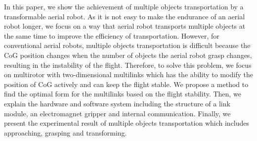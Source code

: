 In this paper, we show the achievement of multiple objects transportation by a transformable aerial robot. As it is not easy to make the endurance of an aerial robot longer, we focus on a way that aerial robot transports multiple objects at the same time to improve the efficiency of transportation. However, for conventional aerial robots, multiple objects transportation is difficult because the CoG position changes when the number of objects the aerial robot grasp changes, resulting in the instability of the flight. Therefore, to solve this problem, we focus on multirotor with two-dimensional multilinks which has the ability to modify the position of CoG actively and can keep the flight stable. We propose a method to find the optimal form for the multilinks based on the flight stability. Then, we explain the hardware and software system including the structure of a link module, an electromagnet gripper and internal communication. Finally, we present the experimental result of multiple objects transportation which includes approaching, grasping and transforming.
